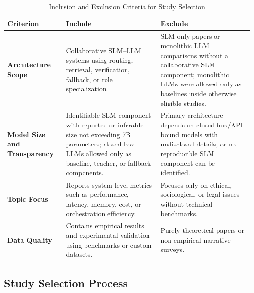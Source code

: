 \begin{table}[!htbp]
    \centering
    \caption{Inclusion and Exclusion Criteria for Study Selection}
    \label{tab:eligibility_criteria}
    \footnotesize
    \setlength{\tabcolsep}{3pt}
    \renewcommand{\arraystretch}{0.94}
    \begin{tabularx}{\linewidth}{@{} p{2.05cm} >{\raggedright\arraybackslash}X >{\raggedright\arraybackslash}X @{}}
        \toprule
        \textbf{Criterion} & \textbf{Include} & \textbf{Exclude} \\
        \midrule
        
        \textbf{Architecture Scope} & 
        Collaborative SLM--LLM systems using routing, retrieval, verification, fallback, or role specialization. & 
        SLM-only papers or monolithic LLM comparisons without a collaborative SLM component; monolithic LLMs were allowed only as baselines inside otherwise eligible studies. \\
        
        \textbf{Model Size and Transparency} & 
        Identifiable SLM component with reported or inferable size not exceeding 7B parameters; closed-box LLMs allowed only as baseline, teacher, or fallback components. & 
        Primary architecture depends on closed-box/API-bound models with undisclosed details, or no reproducible SLM component can be identified. \\
        
        \textbf{Topic Focus} & 
        Reports system-level metrics such as performance, latency, memory, cost, or orchestration efficiency. & 
        Focuses only on ethical, sociological, or legal issues without technical benchmarks. \\
        
        \textbf{Data Quality} & 
        Contains empirical results and experimental validation using benchmarks or custom datasets. & 
        Purely theoretical papers or non-empirical narrative surveys. \\
        
        \bottomrule
    \end{tabularx}
\end{table}

\subsection{Study Selection Process}
\label{sec:study_selection}

